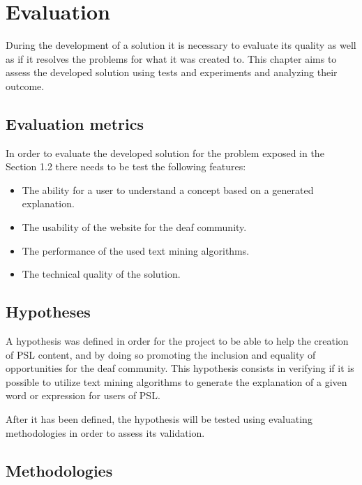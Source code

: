 
\chapter{Evaluation} %
\label{chap:Chapter6}

During the development of a solution it is necessary to evaluate its quality as well as if it resolves the problems for what it was created to.
This chapter aims to assess the developed solution using tests and experiments and analyzing their outcome.

\section{Evaluation metrics}

In order to evaluate the developed solution for the problem exposed in the Section 1.2 there needs to be test the following features:

\begin{itemize}
    \item The ability for a user to understand a concept based on a generated explanation.
    \item The usability of the website for the deaf community.
    \item The performance of the used text mining algorithms.
    \item The technical quality of the solution.
\end{itemize}

\section{Hypotheses}

A hypothesis was defined in order for the project to be able to help the creation of \gls{PSL} content, and by doing so promoting the inclusion and equality of opportunities for the deaf community.
This hypothesis consists in verifying if it is possible to utilize text mining algorithms to generate the explanation of a given word or expression for users of \gls{PSL}.

After it has been defined, the hypothesis will be tested using evaluating methodologies in order to assess its validation.

\section{Methodologies}

